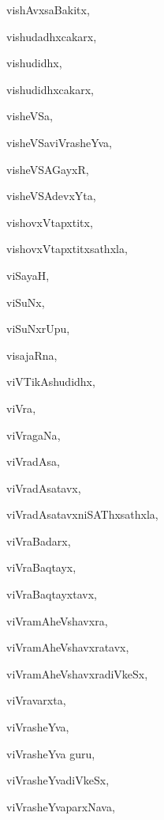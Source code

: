 \begin{multicols}{2}
{vishAvxsaBakitx}, \pageref{vishAvxsaBakitx}

{vishudadhxcakarx}, \pageref{vishudadhxcakarx}

{vishudidhx}, \pageref{vishudidhx}

{vishudidhxcakarx}, \pageref{vishudidhxcakarx}

{visheVSa}, \pageref{visheVSa}

{visheVSaviVrasheYva}, \pageref{visheVSaviVrasheYva}

{visheVSAGayxR}, \pageref{visheVSAGayxR}

{visheVSAdevxYta}, \pageref{visheVSAdevxYta}

{vishovxVtapxtitx}, \pageref{vishovxVtapxtitx}

{vishovxVtapxtitxsathxla}, \pageref{vishovxVtapxtitxsathxla}

{viSayaH}, \pageref{viSayaH}

{viSuNx}, \pageref{viSuNx}

{viSuNxrUpu}, \pageref{viSuNxrUpu}

{visajaRna}, \pageref{visajaRna}

{viVTikAshudidhx}, \pageref{viVTikAshudidhx}

{viVra}, \pageref{viVra}

{viVragaNa}, \pageref{viVragaNa}

{viVradAsa}, \pageref{viVradAsa}

{viVradAsatavx}, \pageref{viVradAsatavx}

{viVradAsatavxniSAThxsathxla}, \pageref{viVradAsatavxniSAThxsathxla}

{viVraBadarx}, \pageref{viVraBadarx}

{viVraBaqtayx}, \pageref{viVraBaqtayx}

{viVraBaqtayxtavx}, \pageref{viVraBaqtayxtavx}

{viVramAheVshavxra}, \pageref{viVramAheVshavxra}

{viVramAheVshavxratavx}, \pageref{viVramAheVshavxratavx}

{viVramAheVshavxradiVkeSx}, \pageref{viVramAheVshavxradiVkeSx}

{viVravarxta}, \pageref{viVravarxta}

{viVrasheYva}, \pageref{viVrasheYva}

{viVrasheYva guru}, \pageref{viVrasheYvaguru}

{viVrasheYvadiVkeSx}, \pageref{viVrasheYvadiVkeSx}

{viVrasheYvaparxNava}, \pageref{viVrasheYvaparxNava}


\end{multicols}
